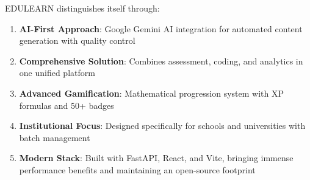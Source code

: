 \documentclass[conference]{IEEEtran}
\begin{document}
\begin{table}[ht]
    \centering
    \caption{Comparison of EDULEARN with Existing Educational Platforms}
    \label{tab:comparison}
\end{table}

EDULEARN distinguishes itself through:
\begin{enumerate}
    \item \textbf{AI-First Approach}: Google Gemini AI integration for automated content generation with quality control
    \item \textbf{Comprehensive Solution}: Combines assessment, coding, and analytics in one unified platform
    \item \textbf{Advanced Gamification}: Mathematical progression system with XP formulas and 50+ badges
    \item \textbf{Institutional Focus}: Designed specifically for schools and universities with batch management
    \item \textbf{Modern Stack}: Built with FastAPI, React, and Vite, bringing immense performance benefits and maintaining an open-source footprint
\end{enumerate}
\end{document}
